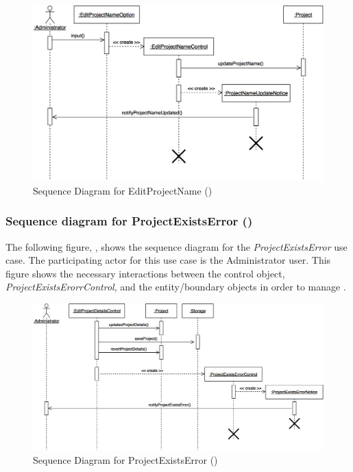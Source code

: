 \documentclass[12pt,letterpaper]{article}
\begin{document}
\begin{figure}[H]
	\centering{}
	\includegraphics[scale=0.27]{imgs/seq/edit-project-name.png}
	\caption[ - Sequence Diagram for EditProjectName]{Sequence Diagram for EditProjectName ()}
\end{figure}

\newpage{}

\subsubsection*{Sequence diagram for ProjectExistsError ()}

The following figure, , shows the sequence diagram for the {\it ProjectExistsError} use case. The participating actor for this use case is
the Administrator user. This figure shows the necessary interactions between the control object, {\it ProjectExistsErorrControl}, and the
entity/boundary objects in order to manage .

\begin{figure}[H]
	\centering{}
	\includegraphics[scale=0.25]{imgs/seq/project-exists-error.png}
	\caption[ - Sequence Diagram for ProjectExistsError]{Sequence Diagram for ProjectExistsError ()}
\end{figure}
\end{document}

